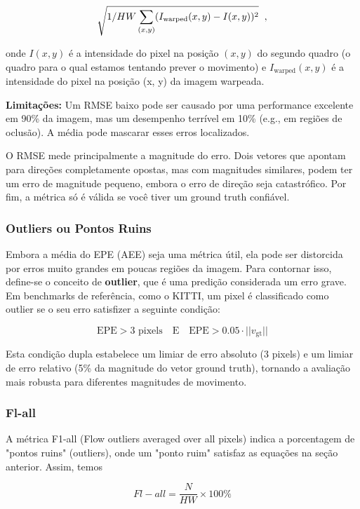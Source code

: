 \documentclass[12pt, a4paper]{article}
\begin{document}
\[ \sqrt{1/HW \sum_{(x,y)} (I_{\text{warped}} (x,y) - I(x,y))^2 } \hspace{0.2cm} ,\]

onde $I(x, y)$ é a intensidade do pixel na posição $(x, y)$ do segundo quadro (o quadro para o qual estamos tentando prever o movimento) e $I_{\text{warped}}(x, y)$ é a intensidade do pixel na posição (x, y) da imagem warpeada.

\textbf{Limitações:} Um RMSE baixo pode ser causado por uma performance excelente em 90\% da imagem, mas um desempenho terrível em 10\% (e.g., em regiões de oclusão). A média pode mascarar esses erros localizados.

O RMSE mede principalmente a magnitude do erro. Dois vetores que apontam para direções completamente opostas, mas com magnitudes similares, podem ter um erro de magnitude pequeno, embora o erro de direção seja catastrófico. Por fim, a métrica só é válida se você tiver um ground truth confiável.

\subsubsection{Outliers ou Pontos Ruins}

Embora a média do EPE (AEE) seja uma métrica útil, ela pode ser distorcida por erros muito grandes em poucas regiões da imagem. Para contornar isso, define-se o conceito de \textbf{outlier}, que é uma predição considerada um erro grave. Em benchmarks de referência, como o KITTI, um pixel é classificado como outlier se o seu erro satisfizer a seguinte condição:

\[ \text{EPE} > 3 \text{ pixels} \quad \text{E} \quad \text{EPE} > 0.05 \cdot || {v}_{\text{gt}}|| \]

Esta condição dupla estabelece um limiar de erro absoluto (3 pixels) e um limiar de erro relativo (5\% da magnitude do vetor ground truth), tornando a avaliação mais robusta para diferentes magnitudes de movimento.

\subsubsection{Fl-all}

A métrica F1-all (Flow outliers averaged over all pixels) indica a porcentagem de "pontos ruins" (outliers), onde um "ponto ruim" satisfaz as equações na seção anterior. Assim, temos

\[ Fl-all = \frac{N}{HW} \times 100\%\]
\end{document}
